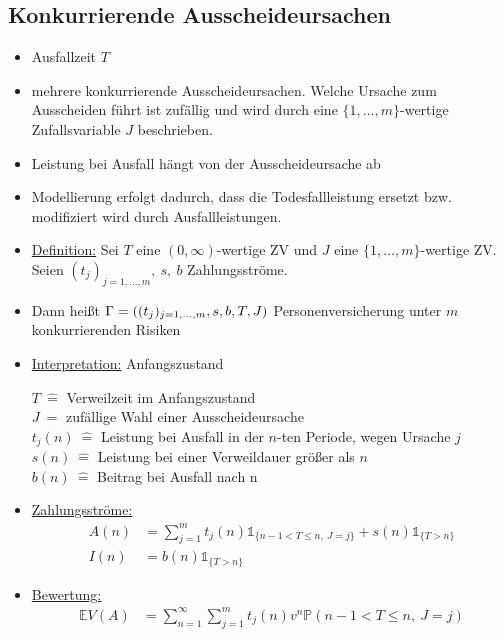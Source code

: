 \subsection{Konkurrierende Ausscheideursachen}
\label{sub:ausscheideursachen}
\begin{itemize}
	\item Ausfallzeit $T$
	\item mehrere konkurrierende Ausscheideursachen. Welche Ursache zum Ausscheiden führt ist zufällig und wird durch eine $\{1,\dots,m\}$-wertige Zufallsvariable $J$ beschrieben.
	\item Leistung bei Ausfall hängt von der Ausscheideursache ab
	\item Modellierung erfolgt dadurch, dass die Todesfallleistung ersetzt bzw. modifiziert wird durch Ausfallleistungen.
	\item \uline{Definition:} Sei $T$ eine $(0,\infty)$-wertige ZV und $J$ eine $\{1,\dots,m\}$-wertige ZV. Seien $(t_j)_{j=1,\dots,m},~s,~b$ Zahlungsströme.
	\item Dann heißt $\Gamma=\left( (t_j)_{j=1,\dots,m},s,b,T,J\right)$ Personenversicherung unter $m$ konkurrierenden Risiken
	\item \uline{Interpretation:} Anfangszustand\\
	\begin{center}
		$T~\mathrel{\hat{=}}$ Verweilzeit im Anfangszustand\\
		$J~\mathrel{\hat{=}}$ zufällige Wahl einer Ausscheideursache\\
		$t_j(n)~\mathrel{\hat{=}}$ Leistung bei Ausfall in der $n$-ten Periode, wegen Ursache $j$\\
		$s(n)~\mathrel{\hat{=}}$ Leistung bei einer Verweildauer größer als $n$\\
		$b(n)~\mathrel{\hat{=}}$ Beitrag bei Ausfall nach n
	\end{center}
	\item \uline{Zahlungsströme:}
	\begin{equation*}
	\begin{aligned}
		A(n) &= \sum_{j=1}^{m}t_j(n)\mathbb{1}_{\{n-1<T\le n,~J=j \}}+s(n)\mathbb{1}_{\{T>n\}}\\
		I(n) &= b(n)\mathbb{1}_{\{T>n\}}
	\end{aligned}
	\end{equation*}
	\item \uline{Bewertung:}
	\begin{equation*}
	\begin{aligned}
		\mathds{E}V(A) &= \sum_{n=1}^{\infty}\sum_{j=1}^{m}t_j(n)v^n\mathds{P}(n-1<T\le n,~J=j)\\

\end{aligned}
\end{equation*}
\end{itemize}
